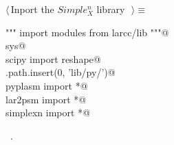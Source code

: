 \documentclass[11pt,oneside]{article}	%
\begin{document}
\begin{flushleft} \small
\begin{minipage}{\linewidth} \label{scrap18}
$\langle\,$Inport the $Simple_X^n$ library\nobreak\ {\footnotesize {}}$\,\rangle\equiv$
\vspace{-1ex}
\begin{list}{}{} \item
\mbox{}\verb@""" import modules from larcc/lib """@\\
\mbox{}\verb@import sys@\\
\mbox{}\verb@from scipy import reshape@\\
\mbox{}\verb@sys.path.insert(0, 'lib/py/')@\\
\mbox{}\verb@from pyplasm import *@\\
\mbox{}\verb@from lar2psm import *@\\
\mbox{}\verb@from simplexn import *@\\
\mbox{}\verb@@{\NWsep}
\end{list}
\vspace{-1ex}
\footnotesize\addtolength{\baselineskip}{-1ex}
\begin{list}{}{\setlength{\itemsep}{-\parsep}\setlength{\itemindent}{-\leftmargin}}
\item \NWtxtMacroRefIn\ .
\end{list}
\end{minipage}\\[4ex]
\end{flushleft}


\end{document}
